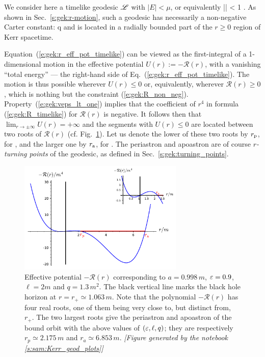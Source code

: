 We consider here a timelike geodesic $\mathscr{L}$ with $|E|< \mu$, or equivalently
\be \label{e:gek:veps_lt_one}
    |\veps| < 1 .
\ee
As shown in Sec.~\ref{s:gek:r-motion}, such a geodesic has necessarily a non-negative
Carter constant:
\be
    q 
\ee
and is located in a radially bounded part of the $r\geq 0$ region of Kerr spacetime.

Equation~(\ref{e:gek:r_eff_pot_timelike}) can be viewed as the first-integral of
a 1-dimensional motion in the effective potential $U(r) := - \mathcal{R}(r)$,
with a vanishing ``total energy'' --- the right-hand side of Eq.~(\ref{e:gek:r_eff_pot_timelike}).
The motion is thus possible wherever $U(r) \leq 0$ or, equivalently, wherever
$\mathcal{R}(r) \geq 0$, which is nothing but the constraint (\ref{e:gek:R_non_neg}).
Property~(\ref{e:gek:veps_lt_one})
implies that the coefficient of $r^4$ in formula
(\ref{e:gek:R_timelike}) for $\mathcal{R}(r)$ is negative. It follows then that
$\lim_{r\to\pm\infty} U(r) = +\infty$ and the segments with $U(r) \leq 0$
are located between two roots of $\mathcal{R}(r)$ (cf. Fig.~\ref{f:gek:R_potential}).
Let us denote the lower of these two roots by $r_{\rm p}$, for , and the larger one by $r_{\rm a}$, for .
The periastron and apoastron are of course \emph{$r$-turning points} of the geodesic,
as defined in Sec.~\ref{s:gek:turning_points}.

\begin{figure}
\centerline{\includegraphics[width=0.7\textwidth]{gek_R_potential.pdf}}
\caption[]{\label{f:gek:R_potential} \footnotesize
Effective potential $-\mathcal{R}(r)$ corresponding to $a=0.998\, m$,
$\varepsilon=0.9$, $\ell=2 m$ and $q=1.3\, m^2$. The black vertical line
marks the black hole horizon at $r=r_+\simeq 1.063\, m$.
Note that the polynomial $-\mathcal{R}(r)$
has four real roots, one of them being very close to, but distinct from, $r_+$.
The two largest roots give the periastron and apoastron of the bound orbit
with the above values of $(\varepsilon,\ell,q)$; they
are respectively $r_p \simeq 2.175\, m$ and
$r_a \simeq 6.853\, m$.
\textsl{[Figure generated by the notebook \ref{s:sam:Kerr_geod_plots}]}
}
\end{figure}

